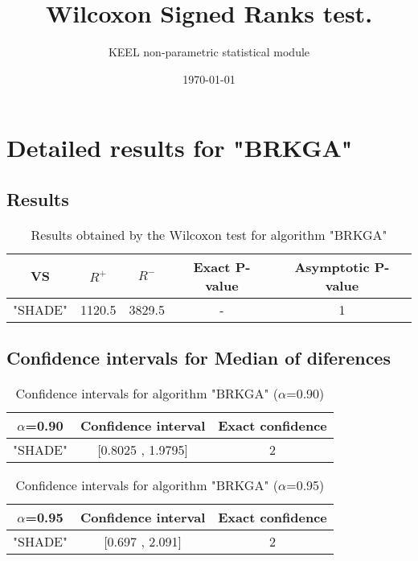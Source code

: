 \documentclass[a4paper,10pt]{article}
\title{Wilcoxon Signed Ranks test.}
\date{\today}
\author{KEEL non-parametric statistical module}
\begin{document}
\pagestyle{empty}
\maketitle
\thispagestyle{empty}



\section{Detailed results for "BRKGA"}


\subsection{Results}

\begin{table}[!htp]
\centering\small
\begin{tabular}{
|c|c|c|c|c|}
\hline
 VS & $R^{+}$ & $R^{-}$ & Exact P-value & Asymptotic P-value \\ \hline 
"SHADE" & 1120.5 & 3829.5 & - & 1\\ \hline 

\end{tabular}
\caption{Results obtained by the Wilcoxon test for algorithm "BRKGA"}
\end{table}

\subsection{Confidence intervals for Median of diferences}

\begin{table}[!htp]
\centering\small
\begin{tabular}{
|c|c|c|}
\hline
 $\alpha$=0.90 & Confidence interval & Exact confidence \\ \hline 
"SHADE" & [0.8025 , 1.9795] & 2\\ \hline 

\end{tabular}
\caption{Confidence intervals for algorithm "BRKGA" ($\alpha$=0.90)}
\end{table}
\begin{table}[!htp]
\centering\small
\begin{tabular}{
|c|c|c|}
\hline
 $\alpha$=0.95 & Confidence interval & Exact confidence \\ \hline 
"SHADE" & [0.697 , 2.091] & 2\\ \hline 

\end{tabular}
\caption{Confidence intervals for algorithm "BRKGA" ($\alpha$=0.95)}
\end{table}
\end{document}
